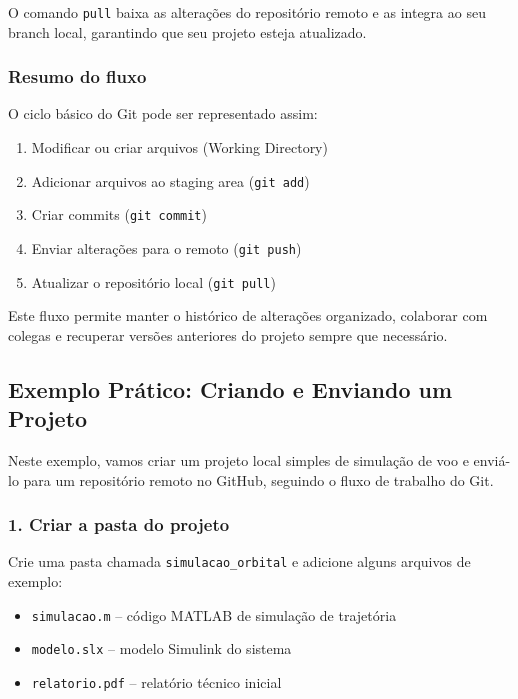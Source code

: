 O comando \texttt{pull} baixa as alterações do repositório remoto e as integra ao seu branch local, garantindo que seu projeto esteja atualizado.

\subsubsection*{Resumo do fluxo}

O ciclo básico do Git pode ser representado assim:

\begin{enumerate}
    \item Modificar ou criar arquivos (Working Directory)
    \item Adicionar arquivos ao staging area (\texttt{git add})
    \item Criar commits (\texttt{git commit})
    \item Enviar alterações para o remoto (\texttt{git push})
    \item Atualizar o repositório local (\texttt{git pull})
\end{enumerate}

Este fluxo permite manter o histórico de alterações organizado, colaborar com colegas e recuperar versões anteriores do projeto sempre que necessário.



\subsection{Exemplo Prático: Criando e Enviando um Projeto}

Neste exemplo, vamos criar um projeto local simples de simulação de voo e enviá-lo para um repositório remoto no GitHub, seguindo o fluxo de trabalho do Git.

\subsubsection*{1. Criar a pasta do projeto}

Crie uma pasta chamada \texttt{simulacao\_orbital} e adicione alguns arquivos de exemplo:

\begin{itemize}
    \item \texttt{simulacao.m} – código MATLAB de simulação de trajetória
    \item \texttt{modelo.slx} – modelo Simulink do sistema
    \item \texttt{relatorio.pdf} – relatório técnico inicial
\end{itemize}

